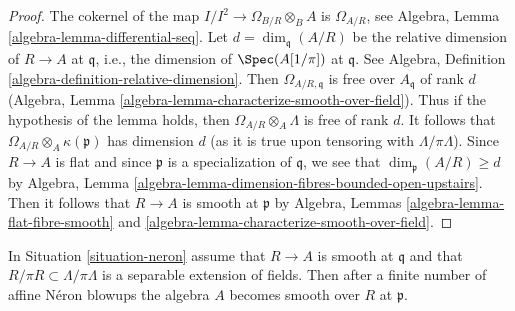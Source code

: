 \begin{proof}
The cokernel of the map $I/I^2 \to \Omega_{B/R} \otimes_B A$
is $\Omega_{A/R}$, see Algebra, Lemma \ref{algebra-lemma-differential-seq}.
Let $d = \dim_\mathfrak q(A/R)$ be the relative dimension of $R \to A$
at $\mathfrak q$, i.e., the dimension of $\Spec(A[1/\pi])$ at $\mathfrak q$.
See Algebra, Definition \ref{algebra-definition-relative-dimension}.
Then $\Omega_{A/R, \mathfrak q}$ is free over $A_\mathfrak q$ of rank $d$
(Algebra, Lemma \ref{algebra-lemma-characterize-smooth-over-field}).
Thus if the hypothesis of the lemma holds,
then $\Omega_{A/R} \otimes_A \Lambda$ is free of rank $d$.
It follows that $\Omega_{A/R} \otimes_A \kappa(\mathfrak p)$
has dimension $d$ (as it is true upon tensoring with $\Lambda/\pi \Lambda$).
Since $R \to A$ is flat and since $\mathfrak p$
is a specialization of $\mathfrak q$, we see that
$\dim_\mathfrak p(A/R) \geq d$ by Algebra, Lemma
\ref{algebra-lemma-dimension-fibres-bounded-open-upstairs}.
Then it follows that $R \to A$ is smooth at $\mathfrak p$ by
Algebra, Lemmas \ref{algebra-lemma-flat-fibre-smooth} and
\ref{algebra-lemma-characterize-smooth-over-field}.
\end{proof}

\begin{lemma}
\label{lemma-neron-desingularization}
In Situation \ref{situation-neron}
assume that $R \to A$ is smooth at $\mathfrak q$
and that $R/\pi R \subset \Lambda/\pi \Lambda$ is a separable
extension of fields. Then after a finite number of affine N\'eron
blowups the algebra $A$ becomes smooth over $R$ at $\mathfrak p$.
\end{lemma}

